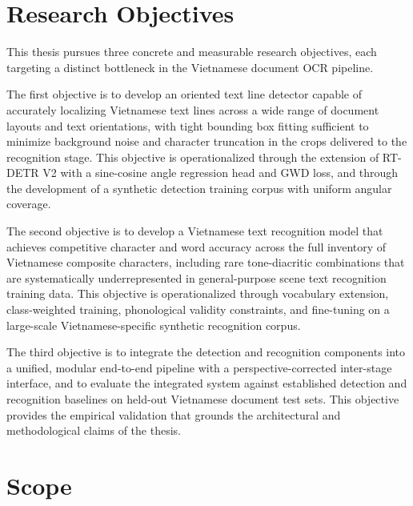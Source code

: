 
\section{Research Objectives}

This thesis pursues three concrete and measurable research objectives, each targeting a distinct bottleneck in the Vietnamese document OCR pipeline.

The first objective is to develop an oriented text line detector capable of accurately localizing Vietnamese text lines across a wide range of document layouts and text orientations, with tight bounding box fitting sufficient to minimize background noise and character truncation in the crops delivered to the recognition stage. This objective is operationalized through the extension of RT-DETR V2 with a sine-cosine angle regression head and GWD loss, and through the development of a synthetic detection training corpus with uniform angular coverage.

The second objective is to develop a Vietnamese text recognition model that achieves competitive character and word accuracy across the full inventory of Vietnamese composite characters, including rare tone-diacritic combinations that are systematically underrepresented in general-purpose scene text recognition training data. This objective is operationalized through vocabulary extension, class-weighted training, phonological validity constraints, and fine-tuning on a large-scale Vietnamese-specific synthetic recognition corpus.

The third objective is to integrate the detection and recognition components into a unified, modular end-to-end pipeline with a perspective-corrected inter-stage interface, and to evaluate the integrated system against established detection and recognition baselines on held-out Vietnamese document test sets. This objective provides the empirical validation that grounds the architectural and methodological claims of the thesis.

\section{Scope}


